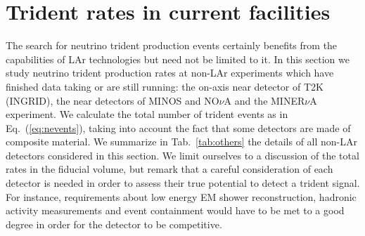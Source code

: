 \section{Trident rates in current facilities}
\label{app:rates_other}

The search for neutrino trident production events certainly benefits from the capabilities of LAr technologies but need not be limited to it. In this section we study neutrino trident production rates at non-LAr experiments which have finished data taking or are still running: the on-axis near detector of T2K (INGRID), the near detectors of MINOS and NO$\nu$A and the MINER$\nu$A experiment. We calculate the total number of trident events as in Eq.~(\ref{eq:nevents}), taking into account the fact that some detectors are made of composite material. We summarize in Tab.~\ref{tab:others} the details of all non-LAr detectors considered in this section. We limit ourselves to a discussion of the total rates in the fiducial volume, but remark that a careful consideration of each detector is needed in order to assess their true potential to detect a trident signal. For instance, requirements about low energy EM shower reconstruction, hadronic activity measurements and event containment would have to be met to a good degree in order for the detector to be competitive. 

\renewcommand{\arraystretch}{1.2}
\begin{table}[h]
\begin{center}
\end{center}
\caption{\label{tab:others} Summary of the non-LAr detector set-up and values used in our calculations. The POT numbers are given for a neutrino (antineutrino) beam.}
\end{table}

